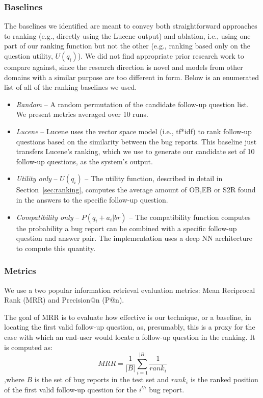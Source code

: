 \subsubsection{Baselines}
The baselines we identified are meant to convey both straightforward approaches to ranking (e.g., directly using the Lucene output) and
ablation, i.e., using one part of our ranking function but not the other (e.g., ranking based only on the question utility, $U(q_{i})$).
We did not find appropriate prior research work to compare against, since the research direction is novel and models from other domains
with a similar purpose are too different in form. Below is an enumerated list of all of the ranking baselines we used.
\begin{itemize}
\item {\em Random} -- A random permutation of the candidate follow-up question list. We present metrics averaged over 10 runs.
\item {\em Lucene} -- Lucene uses the vector space model (i.e., tf*idf) to rank follow-up questions based on the similarity between the bug reports. This baseline just transfers Lucene's ranking, which we use to generate our candidate set of 10 follow-up questions, as the system's output.
\item {\em Utility only} -- $U(q_{i})$ -- The utility function, described in detail in Section~\ref{sec:ranking}, computes the average amount of OB,EB or S2R found in the answers to the specific follow-up question.
\item {\em Compatibility only} -- $P(q_{i}+a_{i}|br)$ -- The compatibility function computes the probability a bug report can be combined with a specific follow-up question and answer pair. The implementation uses a deep NN architecture to compute this quantity.
\end{itemize}

\subsubsection{Metrics}
We use a two popular information retrieval evaluation metrics: Mean Reciprocal Rank (MRR) and Precision@n (P@n).

The goal of MRR is to evaluate how effective is our technique, or a baseline, in locating the first valid follow-up question, as, presumably, this is a proxy for the ease with which an end-user would locate a follow-up question in the ranking. It is
computed as: $$MRR = \frac{1}{|B|} \sum_{i=1}^{|B|} \frac{1}{rank_{i}}$$ ,where $B$ is the set of bug reports in the test set and $rank_{i}$ is the ranked position of the first valid follow-up question for the $i^{th}$ bug report.

